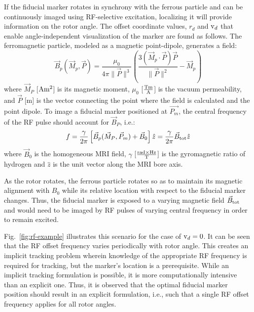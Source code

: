 \documentclass[journal]{IEEEtran}
\newcommand{\norm}[1]{\lVert#1\rVert}
\begin{document}
If the fiducial marker rotates in synchrony with the ferrous particle and can be continuously imaged using RF-selective excitation, localizing it will provide information on the rotor angle. The offset coordinate values, $r_d$ and $\textnormal{v}_d$ that enable angle-independent visualization of the marker are found as follows.
The ferromagnetic particle, modeled as a magnetic point-dipole, generates a field:
\begin{equation}
	\vec{B}_p(\vec{M}_p, \vec{P}) = \dfrac{\mu_{0}}{4 \pi \norm{\vec{P}}^{3} } \left( \dfrac{3(\vec{M}_p \cdot \vec{P}) \vec{P} }{\norm{\vec{P}}^{2} } - \vec{M}_p \right)
\label{eq:dipole-model}
\end{equation}
where $\vec{M}_P$ [$\textnormal{A}\textnormal{m}^{2}$] is its magnetic moment, $\mu_{0}$ [$\frac{\textnormal{Tm}}{\textnormal{A}}$] is the vacuum permeability, and $\vec{P}$ [m] is the vector connecting the point where the field is calculated and the point dipole. To image a fiducial marker positioned at $\vec{P_m}$, the central frequency of the RF pulse should account for $\vec{B}_P$, i.e.:
\begin{equation}
	f = \dfrac{\gamma}{2\pi}\left[\vec{B}_p(\vec{M}_P, \vec{P}_m) + \vec{B}_0\right] \hat{z}  = \dfrac{\gamma}{2\pi}\vec{B}_\textnormal{tot} \hat{z}
\label{eq:frequency}
\end{equation}
where $\vec{B}_0$ is the homogeneous MRI field, $\gamma$ [$\frac{\textnormal{rad}\times\textnormal{Hz}}{\textnormal{T}}$] is the gyromagnetic ratio of hydrogen and $\hat{z}$ is the unit vector along the MRI bore axis. 

As the rotor rotates, the ferrous particle rotates so as to maintain its magnetic alignment with $B_0$ while its relative location with respect to the fiducial marker changes. Thus, the fiducial marker is exposed to a varying magnetic field $\vec{B}_\textnormal{tot}$ and would need to be imaged by RF pulses of varying central frequency in order to remain excited.

Fig.\ \ref{fig:rf-example} illustrates this scenario for the case of $\textnormal{v}_d=0$. It can be seen that the RF offset frequency varies periodically with rotor angle. This creates an implicit tracking problem wherein knowledge of the appropriate RF frequency is required for tracking, but the marker's location is a prerequisite. While an implicit tracking formulation is possible, it is more computationally intensive than an explicit one. Thus, it is observed that the optimal fiducial marker position should result in an explicit formulation, i.e., such that a single RF offset frequency applies for all rotor angles.
\end{document}
